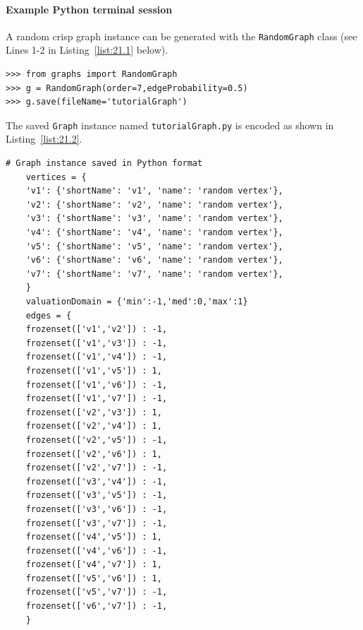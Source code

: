 \paragraph{\textbf{Example Python terminal session}}

\noindent A random crisp graph instance can be generated with the \texttt{RandomGraph} class (see Lines 1-2 in Listing~\vref{list:21.1} below). 
\begin{lstlisting}[caption={Generating a randm graph instance},label=list:21.1]
>>> from graphs import RandomGraph
>>> g = RandomGraph(order=7,edgeProbability=0.5)
>>> g.save(fileName='tutorialGraph')
\end{lstlisting}

The saved \texttt{Graph} instance named \texttt{tutorialGraph.py} is encoded as shown in Listing~\vref{list:21.2}.
\begin{lstlisting}[caption={Stored instance of the random graph},label=list:21.2]
    # Graph instance saved in Python format
    vertices = {
    'v1': {'shortName': 'v1', 'name': 'random vertex'},
    'v2': {'shortName': 'v2', 'name': 'random vertex'},
    'v3': {'shortName': 'v3', 'name': 'random vertex'},
    'v4': {'shortName': 'v4', 'name': 'random vertex'},
    'v5': {'shortName': 'v5', 'name': 'random vertex'},
    'v6': {'shortName': 'v6', 'name': 'random vertex'},
    'v7': {'shortName': 'v7', 'name': 'random vertex'},
    }
    valuationDomain = {'min':-1,'med':0,'max':1}
    edges = {
    frozenset(['v1','v2']) : -1, 
    frozenset(['v1','v3']) : -1, 
    frozenset(['v1','v4']) : -1, 
    frozenset(['v1','v5']) : 1, 
    frozenset(['v1','v6']) : -1, 
    frozenset(['v1','v7']) : -1, 
    frozenset(['v2','v3']) : 1, 
    frozenset(['v2','v4']) : 1, 
    frozenset(['v2','v5']) : -1, 
    frozenset(['v2','v6']) : 1, 
    frozenset(['v2','v7']) : -1, 
    frozenset(['v3','v4']) : -1, 
    frozenset(['v3','v5']) : -1, 
    frozenset(['v3','v6']) : -1, 
    frozenset(['v3','v7']) : -1, 
    frozenset(['v4','v5']) : 1, 
    frozenset(['v4','v6']) : -1, 
    frozenset(['v4','v7']) : 1, 
    frozenset(['v5','v6']) : 1, 
    frozenset(['v5','v7']) : -1, 
    frozenset(['v6','v7']) : -1, 
    }
\end{lstlisting}

